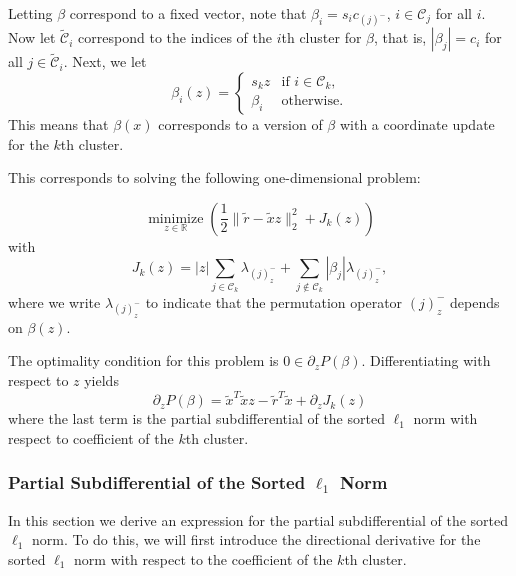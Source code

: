 Letting \(\beta\) correspond to a fixed vector, note that
\(\beta_i = s_i c_{(j)^-}\), \(i \in \mathcal{C}_j\) for all
\(i\). Now let \(\tilde{\mathcal{C}}_i\)
correspond to the indices of the \(i\)th cluster for \(\beta\), that is,
\(|\beta_j| = c_i\) for all \(j \in \tilde{\mathcal{C}}_i\).
Next, we let
\begin{equation}
  \label{eq:coordinate-update-beta}
  \beta_i(z) =
  \begin{cases}
    s_k z   & \text{if } i \in \mathcal{C}_k, \\
    \beta_i & \text{otherwise.}
  \end{cases}
\end{equation}
This means that \(\beta(x)\) corresponds to a version of \(\beta\) with a
coordinate update for the \(k\)th cluster.

This corresponds to solving the following
one-dimensional problem:

\begin{equation}
  \label{eq:cluster-problem}
  \operatorname*{minimize}_{z \in \mathbb{R}} \left( \frac{1}{2} \lVert \tilde r - \tilde x z \rVert_2^2 + J_k(z)\right)
\end{equation}
with
\[
  J_k(z) = |z| \sum_{j \in \mathcal{C}_k} \lambda_{(j)^-_z}
  + \sum_{j \notin \mathcal{C}_k} |\beta_j| \lambda_{(j)^-_z},
\]
where we write \(\lambda_{(j)^-_z}\) to indicate that the permutation operator \((j)^-_z\)
depends on \(\beta(z)\).

The optimality condition for this problem is \(0 \in \partial_z P(\beta).\)
Differentiating with respect to \(z\) yields
\begin{equation}
  \label{eq:cluster-grad}
  \partial_{z} P(\beta) = \tilde x^T \tilde x z - \tilde r^T \tilde x + \partial_{z} J_k(z)
\end{equation}
where the last term is the partial subdifferential of the sorted \(\ell_1\)
norm with respect to coefficient of the \(k\)th cluster.

\subsubsection{Partial Subdifferential of the Sorted \(\ell_1\) Norm}

In this section we derive an expression for the partial subdifferential of the
sorted \(\ell_1\) norm. To do this, we will first introduce the directional
derivative for the sorted \(\ell_1\) norm with respect to the coefficient of
the \(k\)th cluster.

